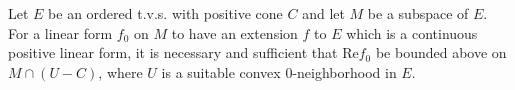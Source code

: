 Let $E$ be an ordered t.v.s. with positive cone $C$ and let $M$ be a subspace of $E$. For a linear form $f_0$ on $M$ to have an extension $f$ to $E$ which is a continuous positive linear form, it is necessary and sufficient that $\text{Re} f_0$ be bounded above on $M \cap (U - C)$, where $U$ is a suitable convex 0-neighborhood in $E$.
